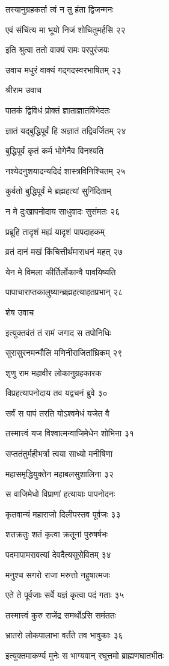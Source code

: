 तस्यानुग्रहकर्ता त्वं न तु हंता द्विजन्मनः

एवं संचिंत्य मा भूयो निजं शोचितुमर्हसि २२

इति श्रुत्वा ततो वाक्यं रामः परपुरंजयः

उवाच मधुरं वाक्यं गद्गदस्वरभाषितम् २३

श्रीराम उवाच

पातकं द्विविधं प्रोक्तं ज्ञाताज्ञातविभेदतः

ज्ञातं यद्बुद्धिपूर्वं हि अज्ञातं तद्विवर्जितम् २४

बुद्धिपूर्वं कृतं कर्म भोगेनैव विनश्यति

नश्येदनुशयादन्यदिदं शास्त्रविनिश्चितम् २५

कुर्वतो बुद्धिपूर्वं मे ब्रह्महत्यां सुनिंदिताम्

न मे दुःखापनोदाय साधुवादः सुसंमतः २६

प्रब्रूहि तादृशं मह्यं यादृशं पापदाहकम्

व्रतं दानं मखं किंचित्तीर्थमाराधनं महत् २७

येन मे विमला कीर्तिर्लोकान्वै पावयिष्यति

पापाचाराप्तकालुष्यान्ब्रह्महत्याहतप्रभान् २८

शेष उवाच

इत्युक्तवंतं तं रामं जगाद स तपोनिधिः

सुरासुरनमन्मौलि मणिनीराजितांघ्रिकम् २९

शृणु राम महावीर लोकानुग्रहकारक

विप्रहत्यापनोदाय तव यद्वचनं ब्रुवे ३०

सर्वं स पापं तरति योऽश्वमेधं यजेत वै

तस्मात्त्वं यज विश्वात्मन्वाजिमेधेन शोभिना ३१

सप्ततंतुर्महीभर्त्रा त्वया साध्यो मनीषिणा

महासमृद्धियुक्तेन महाबलसुशालिना ३२

स वाजिमेधो विप्राणां हत्यायाः पापनोदनः

कृतवान्यं महाराजो दिलीपस्तव पूर्वजः ३३

शतक्रतुः शतं कृत्वा क्रतूनां पुरुषर्षभः

पदमापामरावत्यां देवदैत्यसुसेवितम् ३४

मनुश्च सगरो राजा मरुत्तो नहुषात्मजः

एते ते पूर्वजाः सर्वे यज्ञं कृत्वा पदं गताः ३५

तस्मात्त्वं कुरु राजेंद्र समर्थोऽसि समंततः

भ्रातरो लोकपालाभा वर्तंते तव भावुकाः ३६

इत्युक्तमाकर्ण्य मुनेः स भाग्यवान् रघूत्तमो ब्राह्मणघातभीतः

